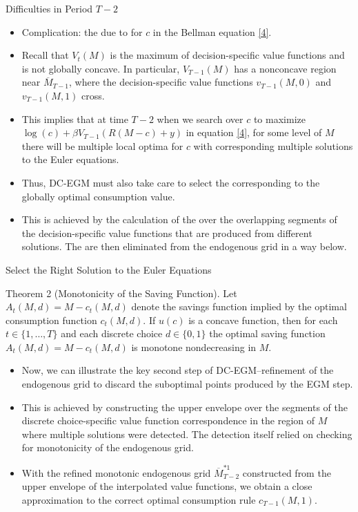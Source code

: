 \documentclass[aspectratio=169]{beamer}
\newcommand{\highlight}[1]{{\color{blue}{#1}}}
\begin{document}
\begin{frame}{Difficulties in Period $T-2$}
	\begin{itemize}
		\item Complication: the \highlight{emergence of secondary kinks} due to \highlight{multiple local optima} for $c$ in the Bellman equation \ref{4}.
		\item Recall that $V_t(M)$ is the maximum of decision-specific value functions and is not globally concave. In particular, $V_{T-1}(M)$ has a nonconcave region near $\overline{M}_{T-1}$, where the decision-specific value functions $v_{T-1}(M,0)$ and $v_{T-1}(M,1)$ cross.
		\item This implies that at time $T-2$ when we search over $c$ to maximize $\log(c) + \beta V_{T-1}(R(M-c)+y)$ in equation \ref{4}, for some level of $M$ there will be multiple local optima for $c$ with corresponding multiple solutions to the Euler equations.
		\item Thus, DC-EGM must also take care to select the \highlight{correct solution to the Euler equation} corresponding to the globally optimal consumption value.
		\item This is achieved by the calculation of the \highlight{upper envelope} over the overlapping segments of the decision-specific value functions that are produced from different solutions. The \highlight{dominated grid points} are then eliminated from the endogenous grid in a way below.
		
	\end{itemize}
\end{frame}


\begin{frame}{Select the Right Solution to the Euler Equations} \small
	\begin{theorem} \label{thm2}
		Theorem 2 (Monotonicity of the Saving Function). Let $A_t(M, d) = M - c_t(M, d)$ denote the savings function implied by the optimal consumption function $c_t(M, d)$. If $u(c)$ is a concave function, then for each $t \in \{1, \ldots, T\}$ and each discrete choice $d \in \{0,1\}$ the optimal saving function $A_t(M, d) = M - c_t(M, d)$ is monotone nondecreasing in $M$.
	\end{theorem}
	\begin{itemize}
		\item Now, we can illustrate the key second step of DC-EGM--refinement of the endogenous grid to discard the suboptimal points produced by the EGM step.
		\item This is achieved by constructing the upper envelope over the segments of the discrete choice-specific value function correspondence in the region of $M$ where multiple solutions were detected. The detection itself relied on checking for monotonicity of the endogenous grid.
		\item With the refined monotonic endogenous grid $\overline{M}_{T-2}^{*1}$ constructed from the upper envelope of the interpolated value functions, we obtain a close approximation to the correct optimal consumption rule $c_{T-1}(M, 1)$.
	\end{itemize}
\end{frame}
\end{document}
